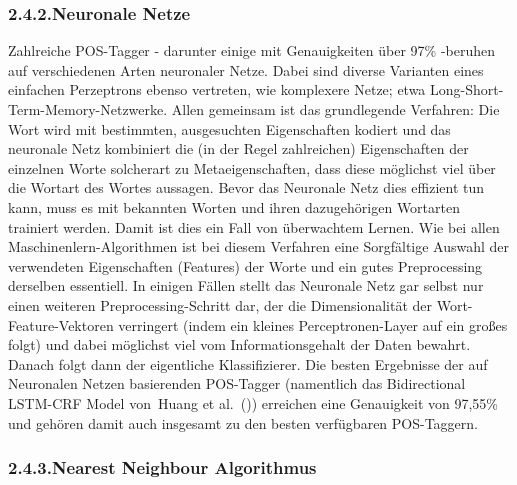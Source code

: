 \documentclass{article}
\begin{document}
\subsubsection{2.4.2.\hspace*{0.5em}Neuronale Netze}\label{sec-neuronale-netze}%

\noindent{}Zahlreiche POS-Tagger - darunter einige mit Genauigkeiten über 97\% -beruhen auf verschiedenen Arten neuronaler Netze. Dabei sind diverse Varianten eines einfachen Perzeptrons ebenso vertreten, wie komplexere Netze; etwa Long-Short-Term-Memory-Netzwerke.
Allen gemeinsam ist das grundlegende Verfahren: Die Wort wird mit bestimmten, ausgesuchten Eigenschaften kodiert und das neuronale Netz kombiniert die (in der Regel zahlreichen) Eigenschaften der einzelnen Worte solcherart zu Metaeigenschaften, dass diese möglichst viel über die Wortart des Wortes aussagen. Bevor das Neuronale Netz dies effizient tun kann, muss es mit bekannten Worten und ihren dazugehörigen Wortarten trainiert werden. Damit ist dies ein Fall von überwachtem Lernen.
Wie bei allen Maschinenlern-Algorithmen ist bei diesem Verfahren eine Sorgfältige Auswahl der verwendeten Eigenschaften (Features) der Worte und ein gutes Preprocessing derselben essentiell. In einigen Fällen stellt das Neuronale Netz gar selbst nur einen weiteren Preprocessing-Schritt dar, der die Dimensionalität der Wort-Feature-Vektoren verringert (indem ein kleines Perceptronen-Layer auf ein großes folgt) und dabei möglichst viel vom Informationsgehalt der Daten bewahrt. Danach folgt dann der eigentliche Klassifizierer.
Die besten Ergebnisse der auf Neuronalen Netzen basierenden POS-Tagger (namentlich das Bidirectional LSTM-CRF Model von~Huang et al.~()) erreichen eine Genauigkeit von 97,55\% und gehören damit auch insgesamt zu den besten verfügbaren POS-Taggern.%

\subsubsection{2.4.3.\hspace*{0.5em}Nearest Neighbour Algorithmus}\label{sec-nearest-neighbour-algorithmus}%
\end{document}
